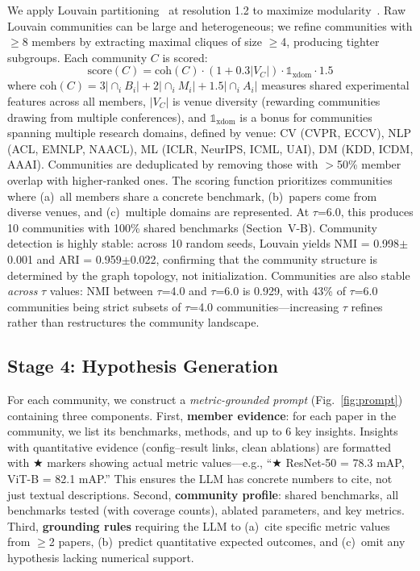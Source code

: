\documentclass[conference]{IEEEtran}
\begin{document}
We apply Louvain partitioning~\cite{blondel2008louvain} at resolution 1.2 to maximize modularity~\cite{fortunato2010community}.
Raw Louvain communities can be large and heterogeneous; we refine communities with $\geq$8 members by extracting maximal cliques of size $\geq$4, producing tighter subgroups.
Each community $C$ is scored:
\begin{equation}
\text{score}(C) = \text{coh}(C) \cdot (1 + 0.3|V_C|) \cdot \mathbb{1}_{\text{xdom}} \cdot 1.5
\end{equation}
where $\text{coh}(C) = 3|\cap_i B_i| + 2|\cap_i M_i| + 1.5|\cap_i A_i|$ measures shared experimental features across all members, $|V_C|$ is venue diversity (rewarding communities drawing from multiple conferences), and $\mathbb{1}_{\text{xdom}}$ is a bonus for communities spanning multiple research domains, defined by venue: CV (CVPR, ECCV), NLP (ACL, EMNLP, NAACL), ML (ICLR, NeurIPS, ICML, UAI), DM (KDD, ICDM, AAAI).
Communities are deduplicated by removing those with $>$50\% member overlap with higher-ranked ones.
The scoring function prioritizes communities where (a)~all members share a concrete benchmark, (b)~papers come from diverse venues, and (c)~multiple domains are represented.
At $\tau$=6.0, this produces 10 communities with 100\% shared benchmarks (Section~V-B).
Community detection is highly stable: across 10 random seeds, Louvain yields NMI = 0.998$\pm$0.001 and ARI = 0.959$\pm$0.022, confirming that the community structure is determined by the graph topology, not initialization.
Communities are also stable \emph{across} $\tau$ values: NMI between $\tau$=4.0 and $\tau$=6.0 is 0.929, with 43\% of $\tau$=6.0 communities being strict subsets of $\tau$=4.0 communities---increasing $\tau$ refines rather than restructures the community landscape.


\subsection{Stage 4: Hypothesis Generation}

For each community, we construct a \emph{metric-grounded prompt} (Fig.~\ref{fig:prompt}) containing three components.
First, \textbf{member evidence}: for each paper in the community, we list its benchmarks, methods, and up to 6 key insights.
Insights with quantitative evidence (config--result links, clean ablations) are formatted with $\bigstar$ markers showing actual metric values---e.g., ``$\bigstar$ ResNet-50 = 78.3 mAP, ViT-B = 82.1 mAP.''
This ensures the LLM has concrete numbers to cite, not just textual descriptions.
Second, \textbf{community profile}: shared benchmarks, all benchmarks tested (with coverage counts), ablated parameters, and key metrics.
Third, \textbf{grounding rules} requiring the LLM to (a)~cite specific metric values from $\geq$2 papers, (b)~predict quantitative expected outcomes, and (c)~omit any hypothesis lacking numerical support.
\end{document}
